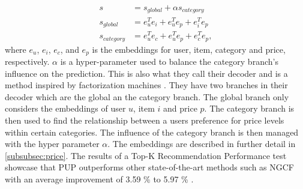 \begin{equation}
    \begin{split}
        s & = s_{global} + \alpha s_{category} \\
        s_{global} & = e^T_u e_i + e^T_u e_p + e^T_i e_p \\
        s_{category} & = e^T_u e_c + e^T_u e_p + e^T_c e_p,
    \end{split}
    \label{eq:price-aware-prediction}
\end{equation}
where $e_u$, $e_i$, $e_c$, and $e_p$ is the embeddings for user, item, category and price, respectively.
$\alpha$ is a hyper-parameter used to balance the category branch's influence on the prediction.
This is also what they call their decoder and is a method inspired by factorization machines \cite{Priceaware}.
They have two branches in their decoder which are the global an the category branch.
The global branch only considers the embeddings of user $u$, item $i$ and price $p$.
The category branch is then used to find the relationship between a users preference for price levels within certain categories.
The influence of the category branch is then managed with the hyper parameter $\alpha$.
The embeddings are described in further detail in \autoref{subsubsec:price}.
The results of a Top-K Recommendation Performance test showcase that PUP outperforms other state-of-the-art methods such as NGCF with an average improvement of 3.59 \% to 5.97 \% \cite{Priceaware}.
